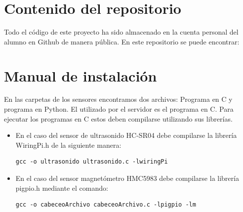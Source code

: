 \section{Contenido del repositorio}

Todo el código de este proyecto ha sido almacenado en la cuenta personal del alumno en Github de manera pública. En este repositorio se puede encontrar:\\


\section{Manual de instalación}

En las carpetas de los sensores encontramos dos archivos: Programa en C y programa en Python. El utilizado por el servidor es el programa en C. Para ejecutar los programas en C estos deben compilarse utilizando sus librerías. 

\begin{itemize}
    \item En el caso del sensor de ultrasonido HC-SR04 debe compilarse la librería WiringPi.h de la siguiente manera:
    \begin{lstlisting}[style=terminal]
    gcc -o ultrasonido ultrasonido.c -lwiringPi
    \end{lstlisting}
    
    \item En el caso del sensor magnetómetro HMC5983 debe compilarse la librería pigpio.h mediante el comando: 
     \begin{lstlisting}[style=terminal]
    gcc -o cabeceoArchivo cabeceoArchivo.c -lpigpio -lm
    \end{lstlisting}
    
\end{itemize}

